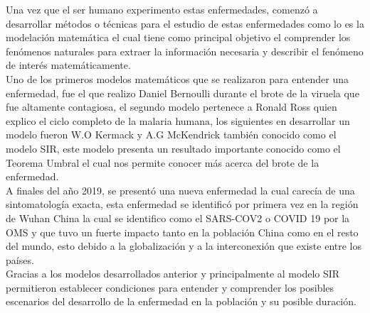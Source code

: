\newpage
Una vez que el ser humano experimento estas enfermedades, comenzó a desarrollar métodos o técnicas para el estudio de estas enfermedades 
como lo es la modelación matemática el cual tiene como principal objetivo el comprender los fenómenos naturales para extraer la información necesaria y describir el fenómeno de interés matemáticamente.\\ 

Uno de los primeros modelos matemáticos que se realizaron para entender una enfermedad, fue el que realizo Daniel Bernoulli durante el brote de la viruela que fue altamente contagiosa, el segundo modelo pertenece a Ronald Ross quien explico el ciclo completo de la malaria humana, los siguientes en desarrollar un modelo fueron W.O Kermack y A.G McKendrick también conocido como el modelo SIR, este modelo presenta un resultado importante conocido como el Teorema Umbral el cual nos permite conocer más acerca del brote de la enfermedad.\\

A finales del año 2019, se presentó una nueva enfermedad la cual carecía de una sintomatología exacta, esta enfermedad se identificó por primera vez en la región de Wuhan China la cual se identifico como el SARS-COV2 o COVID 19 por la OMS y que tuvo un fuerte impacto tanto en la población China como en el resto del mundo, esto debido a la globalización y a la interconexión que existe entre los países.\\

Gracias a los modelos desarrollados anterior y principalmente al modelo SIR permitieron establecer condiciones para entender y comprender los posibles escenarios del desarrollo de la enfermedad en la población y su posible duración.\\

 





%